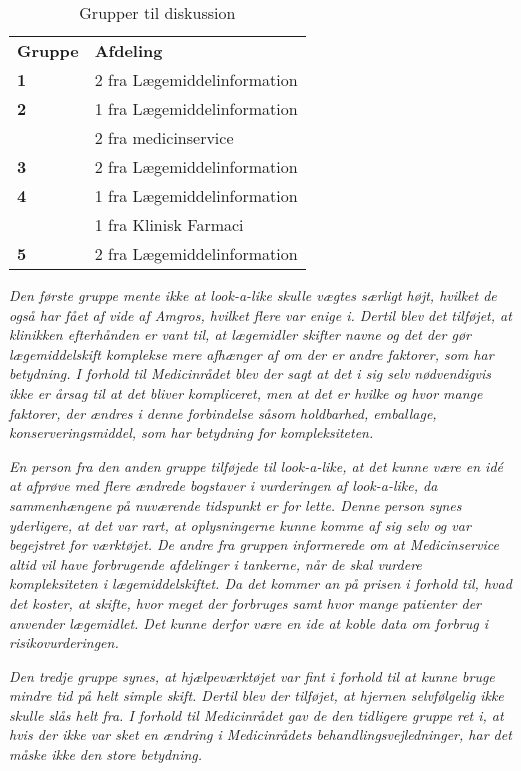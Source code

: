 \begin{table}[H]
\caption{Grupper til diskussion}
\vspace{2mm}
\label{table:grupper}
\centering
\begin{tabular}{l|l}
\rowcolor[HTML]{C0C0C0} \textbf{Gruppe} & \textbf{Afdeling} \\
\textbf{1} & 2 fra Lægemiddelinformation \\ \hline
\textbf{2} \multirow{2}{*}{} & 1 fra Lægemiddelinformation \\  & 2 fra medicinservice\\ \hline
\textbf{3} & 2 fra Lægemiddelinformation \\ \hline
\textbf{4}\multirow{2}{*}{} & 1 fra Lægemiddelinformation \\  & 1 fra Klinisk Farmaci \\ \hline
\textbf{5} & 2 fra Lægemiddelinformation \\ 
\end{tabular}
\end{table}

\textit{Den første gruppe mente ikke at look-a-like skulle vægtes særligt højt, hvilket de også har fået af vide af Amgros, hvilket flere var enige i. Dertil blev det tilføjet, at klinikken efterhånden er vant til, at lægemidler skifter navne og det der gør lægemiddelskift komplekse mere afhænger af om der er andre faktorer, som har betydning. I forhold til Medicinrådet blev der sagt at det i sig selv nødvendigvis ikke er årsag til at det bliver kompliceret, men at det er hvilke og hvor mange faktorer, der ændres i denne forbindelse såsom holdbarhed, emballage, konserveringsmiddel, som har betydning for kompleksiteten.}

\textit{En person fra den anden gruppe tilføjede til look-a-like, at det kunne være en idé at afprøve med flere ændrede bogstaver i vurderingen af look-a-like, da sammenhængene på nuværende tidspunkt er for lette. Denne person synes yderligere, at det var rart, at oplysningerne kunne komme af sig selv og var begejstret for værktøjet. De andre fra gruppen informerede om at Medicinservice altid vil have forbrugende afdelinger i tankerne, når de skal vurdere kompleksiteten i lægemiddelskiftet. Da det kommer an på prisen i forhold til, hvad det koster, at skifte, hvor meget der forbruges samt hvor mange patienter der anvender lægemidlet. Det kunne derfor være en ide at koble data om forbrug i risikovurderingen.}

\textit{Den tredje gruppe synes, at hjælpeværktøjet var fint i forhold til at kunne bruge mindre tid på helt simple skift. Dertil blev der tilføjet, at hjernen selvfølgelig ikke skulle slås helt fra. I forhold til Medicinrådet gav de den tidligere gruppe ret i, at hvis der ikke var sket en ændring i Medicinrådets behandlingsvejledninger, har det måske ikke den store betydning.}

